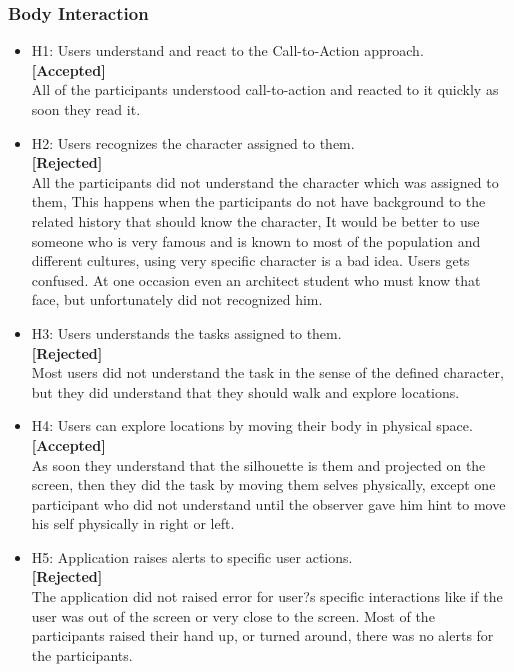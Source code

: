 \subsubsection{Body Interaction}
\begin{itemize}
\item H1: Users understand and react to the Call-to-Action approach.\\ 
\textbf{[Accepted]}\\
All of the participants understood call-to-action and reacted to it quickly as soon they read it.

\item H2: Users recognizes the character assigned to them.\\ 
\textbf{[Rejected]}\\
All the participants did not understand the character which was assigned to them, This happens when the participants do not have background to the related history that should know the character, It would be better to use someone who is very famous and is known to most of the population and different cultures, using very specific character is a bad idea. Users gets confused. At one occasion even an architect student who must know that face, but unfortunately did not recognized him. 

\item H3: Users understands the tasks assigned to them.  \\ 
\textbf{[Rejected]}\\
Most users did not understand the task in the sense of the defined character, but they did understand that they should walk and explore locations.

\item H4: Users can explore locations by moving their body in physical space. \\ 
\textbf{[Accepted]}\\
As soon they understand that the silhouette is them and projected on the screen, then they did the task by moving them selves physically, except one participant who did not understand until the observer gave him hint to move his self physically in right or left.

\item H5: Application raises alerts to specific user actions.   \\ 
\textbf{[Rejected]}\\
The application did not raised error for user?s specific interactions like if the user was out of the screen or very close to the screen. Most of the participants raised their hand up, or turned around, there was no alerts for the participants.


\end{itemize}
